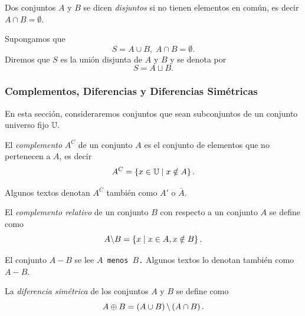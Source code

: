\documentclass[xcolor={svgnames},
  hyperref={colorlinks}, 
  spanish, 12pt]{beamer}
\numberwithin{equation}{section} %
\numberwithin{figure}{section} %
\begin{document}
\begin{frame}
 Dos conjuntos $A$ y $B$ se dicen \emph{disjuntos} si no tienen elementos en com\'un, es decir $A\cap B=\emptyset$.
 \pause
 
 Supongamos que 
 $$
 S=A\cup B, \; A\cap B=\emptyset.
 $$ \pause Diremos que $S$ es la uni\'on disjunta de $A$ y $B$ y se denota por $$S=A \sqcup B.$$ 
 
\end{frame}

\subsubsection{Complementos, Diferencias y Diferencias Sim\'etricas}

\begin{frame}
 En esta secci\'on, consideraremos conjuntos que sean subconjuntos de un conjunto universo fijo $\mathbb{U}.$
\end{frame}

\begin{frame}
 El \emph{complemento} $A^{C}$ de un conjunto $A$ es el conjunto de elementos que no pertenecen a $A$, es decir 
 $$A^{C}=\left\{ x\in \mathbb{U} \mid x \notin A \right\}.$$
\end{frame}

\begin{frame}
 Algunos textos denotan $A^{C}$ tambi\'en como $A'$ o $\bar{A}.$ 
\end{frame}

\begin{frame}
 El \emph{complemento relativo} de un conjunto $B$ con respecto a un conjunto $A$ se define como 
 $$
 A\backslash B = \left\{ x \mid x \in A, x \notin B \right\}.
 $$
\end{frame}

% 


\begin{frame}
 El conjunto $A\minus B$ se lee \texttt{$A$ menos $B$.} Algunos textos lo denotan tambi\'en como $A-B.$  
\end{frame}

\begin{frame}
 La \emph{diferencia sim\'etrica} de los conjuntos $A$ y $B$ se define como $$A\oplus B=\left( A\cup B \right)\backslash \left( A \cap B \right).$$
\end{frame}
\end{document}
